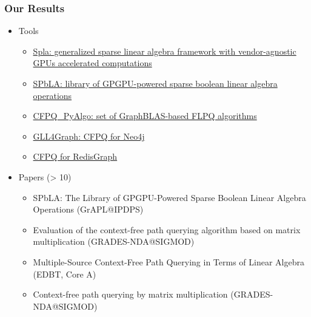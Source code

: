 \documentclass[xcolor=table,aspectratio=169]{beamer}
\begin{document}
\begin{frame}[fragile]
  \frametitle{Our Results}
    \begin{itemize}
      \item Tools
      \begin{itemize}
        \item \href{presentation_graph_analysis}{Spla: generalized sparse linear algebra framework with vendor-agnostic GPUs accelerated computations}
        \item \href{https://github.com/SparseLinearAlgebra/spbla}{SPbLA: library of GPGPU-powered sparse boolean linear algebra operations}    
        \item \href{https://github.com/FormalLanguageConstrainedPathQuerying/CFPQ_PyAlgo}{CFPQ\_PyAlgo: set of GraphBLAS-based FLPQ algorithms}
        \item \href{https://github.com/FormalLanguageConstrainedPathQuerying/GLL4Graph}{GLL4Graph: CFPQ for Neo4j}
        \item \href{https://github.com/YaccConstructor/RedisGraph}{CFPQ for RedisGraph}
      \end{itemize}
      \pause
      \item Papers (> 10)
      \begin{itemize}
        \item SPbLA: The Library of GPGPU-Powered Sparse Boolean Linear Algebra Operations (GrAPL@IPDPS)
        \item Evaluation of the context-free path querying algorithm based on matrix multiplication (GRADES-NDA@SIGMOD)
        \item Multiple-Source Context-Free Path Querying in Terms of Linear Algebra (EDBT, Core A)
        \item Context-free path querying by matrix multiplication (GRADES-NDA@SIGMOD)
      \end{itemize} 
    \end{itemize}
\end{frame}
\end{document}

